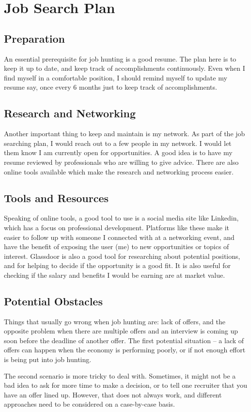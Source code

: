\section{Job Search Plan}

\subsection{Preparation}
An essential prerequisite for job hunting is a good resume. The plan here is to
keep it up to date, and keep track of accomplishments continuously. Even when I
find myself in a comfortable position, I should remind myself to update my
resume say, once every 6 months just to keep track of accomplishments. 

\subsection{Research and Networking}
Another important thing to keep and maintain is my network. As part of the job
searching plan, I would reach out to a few people in my network. I would let
them know I am currently open for opportunities. A good idea is to have my
resume reviewed by professionals who are willing to give advice. There are also
online tools available which make the research and networking process easier.

\subsection{Tools and Resources}
Speaking of online tools, a good tool to use is a social media site like
Linkedin, which has a focus on professional development.  Platforms like these
make it easier to follow up with someone I connected with at a networking
event, and have the benefit of exposing the user (me) to new opportunities or
topics of interest. Glassdoor is also a good tool for researching about
potential positions, and for helping to decide if the opportunity is a good
fit.  It is also useful for checking if the salary and benefits I would be
earning are at market value.

\subsection{Potential Obstacles}
Things that usually go wrong when job hunting are: lack of offers, and the
opposite problem when there are multiple offers and an interview is coming up
soon before the deadline of another offer.  The first potential situation -- a
lack of offers can happen when the economy is performing poorly, or if not
enough effort is being put into job hunting. 

The second scenario is more tricky to deal with. Sometimes, it might not be a
bad idea to ask for more time to make a decision, or to tell one recruiter that
you have an offer lined up. However, that does not always work, and different
approaches need to be considered on a case-by-case basis. 
